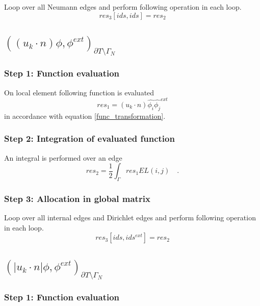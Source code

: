 \documentclass[a4paper,openany]{book}
\begin{document}
Loop over all Neumann edges and perform following operation in each loop.
\begin{equation}
res_3[ids,ids] = res_2
\end{equation}

\subsection{$((u_k \cdot n)\phi,\phi^{ext})_{\partial T \setminus \Gamma_N}$}

\subsubsection{Step 1: Function evaluation}

On local element following function is evaluated 
\begin{equation}
res_1  = (u_k \cdot n) \hat{\phi_i} \hat{\phi_j}^{ext} 
\end{equation}
in accordance with equation \eqref{func_transformation}.

\subsubsection{Step 2: Integration of evaluated function}

An integral is performed over an edge
\begin{equation}
res_2 = \frac{1}{2} \int_{\Gamma} res_1 EL(i,j) \quad \textrm{.}
\end{equation}

\subsubsection{Step 3: Allocation in global matrix}

Loop over all internal edges and Dirichlet edges and perform following operation in each loop.
\begin{equation}
res_3[ids,ids^{ext}] = res_2
\end{equation}

\subsection{$(|u_k \cdot n| \phi,\phi^{ext})_{\partial T \setminus \Gamma_N}$} 

\subsubsection{Step 1: Function evaluation}
\end{document}
